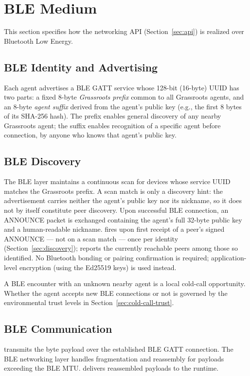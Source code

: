 \section{BLE Medium}
\label{sec:ble}
This section specifies how the networking API (Section~\ref{sec:api}) is realized over Bluetooth Low Energy.
\subsection{BLE Identity and Advertising}
\label{sec:ble-identity}
Each agent advertises a BLE GATT service whose 128-bit (16-byte) UUID has two parts: a fixed 8-byte \emph{Grassroots prefix} common to all Grassroots agents, and an 8-byte \emph{agent suffix} derived from the agent's public key (e.g., the first 8 bytes of its SHA-256 hash). The prefix enables general discovery of any nearby Grassroots agent; the suffix enables recognition of a specific agent before connection, by anyone who knows that agent's public key.
\subsection{BLE Discovery}
\label{sec:ble-discovery}
The BLE layer maintains a continuous scan for devices whose service UUID matches the Grassroots prefix. A scan match is only a discovery hint: the advertisement carries neither the agent's public key nor its nickname, so it does not by itself constitute peer discovery.
Upon successful BLE connection, an ANNOUNCE packet is exchanged containing the agent's full 32-byte public key and a human-readable nickname.  fires upon first receipt of a peer's signed ANNOUNCE --- not on a scan match --- once per identity (Section~\ref{sec:discovery});  reports the currently reachable peers among those so identified. No Bluetooth bonding or pairing confirmation is required; application-level encryption (using the Ed25519 keys) is used instead.

A BLE encounter with an unknown nearby agent is a local cold-call opportunity. Whether the agent accepts new BLE connections or not is governed by the environmental trust levels in Section~\ref{sec:cold-call-trust}.
\subsection{BLE Communication}
\label{sec:ble-comm}
 transmits the byte payload over the established BLE GATT connection. The BLE networking layer handles fragmentation and reassembly for payloads exceeding the BLE MTU.  delivers reassembled payloads to the runtime.